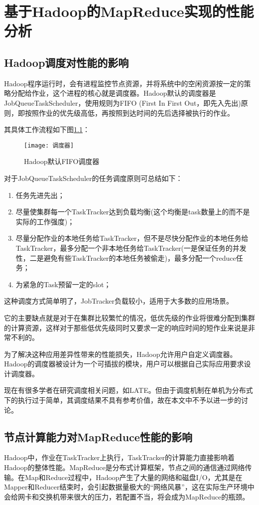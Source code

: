 \chapter{基于Hadoop的MapReduce实现的性能分析}
\label{chap:4}

\section{Hadoop调度对性能的影响}
Hadoop程序运行时，会有进程监控节点资源，并将系统中的空闲资源按一定的策略分配给作业，这个进程的核心就是调度器。Hadoop默认的调度器是JobQueueTaskScheduler，使用规则为FIFO (First In First Out，即先入先出)原则，即按照作业的优先级高低，再按照到达时间的先后选择被执行的作业。

其具体工作流程如下图\ref{fig:调度器}：
\begin{figure}[h]
 \centering
 \texttt{[image: 调度器]}
 \caption{Hadoop默认FIFO调度器}
 \label{fig:调度器}
\end{figure}

对于JobQueueTaskScheduler的任务调度原则可总结如下：

\begin{enumerate}
\item 任务先进先出；
\item 尽量使集群每一个TaskTracker达到负载均衡(这个均衡是task数量上的而不是实际的工作强度)；
\item 尽量分配作业的本地任务给TaskTracker，但不是尽快分配作业的本地任务给TaskTracker，最多分配一个非本地任务给TaskTracker(一是保证任务的并发性，二是避免有些TaskTracker的本地任务被偷走)，最多分配一个reduce任务；
\item 为紧急的Task预留一定的slot；
\end{enumerate}

这种调度方式简单明了，JobTracker负载较小，适用于大多数的应用场景。

它的主要缺点就是对于在集群比较繁忙的情况，低优先级的作业将很难分配到集群的计算资源，这样对于那些低优先级同时又要求一定的响应时间的短作业来说是非常不利的。

为了解决这种应用差异性带来的性能损失，Hadoop允许用户自定义调度器。Hadoop的调度器被设计为一个可插拔的模块，用户可以根据自己实际应用要求设计调度器。

现在有很多学者在研究调度相关问题，如LATE\cite{paper:A-Dynamic-MapReduce-Scheduler-for-Heterogeneous-Workloads}。但由于调度机制在单机为分布式下的执行过于简单，其调度结果不具有参考价值，故在本文中不予以进一步的讨论。

\section{节点计算能力对MapReduce性能的影响}
Hadoop中，作业在TaskTracker上执行，TaskTracker的计算能力直接影响着Hadoop的整体性能。MapReduce是分布式计算框架，节点之间的通信通过网络传输。在Map和Reduce过程中，Hadoop产生了大量的网络和磁盘I/O，尤其是在Mapper和Reducer结束时，会引起数据量极大的“网络风暴”，这在实际生产环境中会给网卡和交换机带来很大的压力，若配置不当，将会成为MapReduce的瓶颈。

